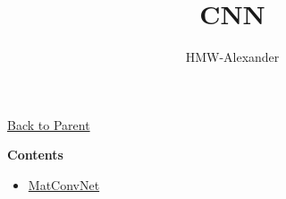 \documentclass[letterpaper,11pt]{article}
\title{\textbf{CNN}}
\author{HMW-Alexander}
\begin{document}
\maketitle

\href{../index.html}{Back to Parent}

\textbf{Contents}
\begin{itemize}
	\item \href{./MatConvNet/document.html}{MatConvNet}
\end{itemize}
	
\end{document}
